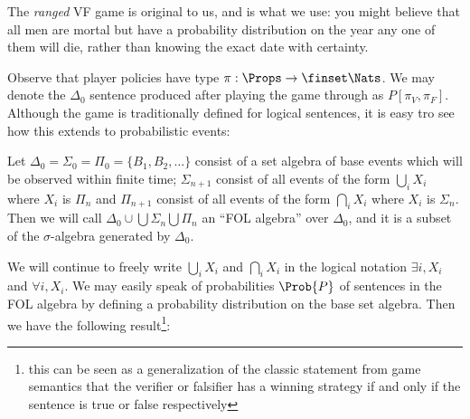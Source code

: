 The \emph{ranged} VF game is original to us, and is what we use: you might believe that all men are mortal but have a probability distribution on the year any one of them will die, rather than knowing the exact date with certainty.

Observe that player policies have type $\pi:\Props\to\finset\Nats$. We may denote the $\Delta_0$ sentence produced after playing the game through as $P[\pi_V,\pi_F]$. Although the game is traditionally defined for logical sentences, it is easy tro see how this extends to probabilistic events:

\begin{definition}
  Let $\Delta_0=\Sigma_0=\Pi_0=\{B_1,B_2,\dots\}$ consist of a set algebra of base events which will be observed within finite time; $\Sigma_{n+1}$ consist of all events of the form $\bigcup_{i}X_i$ where $X_i$ is $\Pi_n$ and $\Pi_{n+1}$ consist of all events of the form $\bigcap_{i}X_i$ where $X_i$ is $\Sigma_n$. Then we will call $\Delta_0\cup\bigcup\Sigma_n\bigcup\Pi_n$ an ``FOL algebra'' over $\Delta_0$, and it is a subset of the $\sigma$-algebra generated by $\Delta_0$.
  \label{nonvf:def:probfol}
\end{definition}

We will continue to freely write $\bigcup_{i}X_i$ and $\bigcap_{i}X_i$ in the logical notation $\exists i,X_i$ and $\forall i,X_i$. We may easily speak of probabilities $\Prob{P}$ of sentences in the FOL algebra by defining a probability distribution on the base set algebra. Then we have the following result\footnote{this can be seen as a generalization of the classic statement from game semantics that the verifier or falsifier has a winning strategy if and only if the sentence is true or false respectively}:


